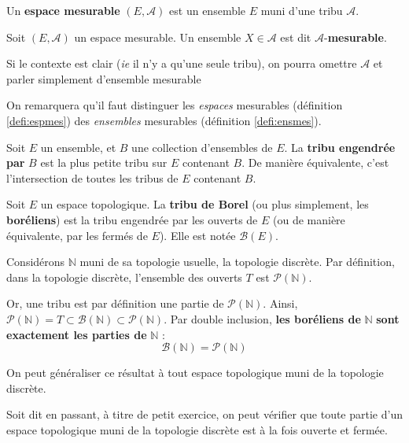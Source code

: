 \documentclass[../integ-proba.tex]{subfiles}
\begin{document}
  \begin{defi}
    \label{defi:espmes}
    Un \textbf{espace mesurable} $\left(E, \mathcal{A}\right)$ est un ensemble $E$ muni d'une tribu $\mathcal{A}$.
  \end{defi}

  \begin{defi}
    \label{defi:ensmes}
    Soit $\left(E, \mathcal{A}\right)$ un espace mesurable. Un ensemble $X\in \mathcal{A}$ est dit $\mathcal{A}$-\textbf{mesurable}.
  \end{defi}

  \begin{rem}
    Si le contexte est clair (\textit{ie} il n'y a qu'une seule tribu), on pourra omettre $\mathcal{A}$ et parler simplement d'ensemble mesurable
  \end{rem}

  \begin{rem}
    On remarquera qu'il faut distinguer les \textit{espaces} mesurables (définition \ref{defi:espmes}) des \textit{ensembles} mesurables (définition \ref{defi:ensmes}).
  \end{rem}

  \begin{defi}
    Soit $E$ un ensemble, et $B$ une collection d'ensembles de $E$.
    La \textbf{tribu engendrée par} $B$ est la plus petite tribu sur $E$ contenant $B$.
    De manière équivalente, c'est l'intersection de toutes les tribus de $E$ contenant $B$.
  \end{defi}

  \begin{defi}
    \label{defi:Borel}
    Soit $E$ un espace topologique.
    La \textbf{tribu de Borel} (ou plus simplement, les \textbf{boréliens}) est la tribu engendrée par les ouverts de $E$ (ou de manière équivalente, par les fermés de $E$).
    Elle est notée $\mathcal{B}(E)$.
  \end{defi}

  \begin{exemple}
    \label{exemple:boreliens_et_topologie_discrete}
    Considérons $\mathbb{N}$ muni de sa topologie usuelle, la topologie discrète.
    Par définition, dans la topologie discrète, l'ensemble des ouverts $T$ est $\mathcal{P}(\mathbb{N})$.

    Or, une tribu est par définition une partie de $\mathcal{P}(\mathbb{N})$.
    Ainsi, $\mathcal{P}(\mathbb{N}) = T \subset \mathcal{B}(\mathbb{N}) \subset \mathcal{P}(\mathbb{N})$.
    Par double inclusion, \textbf{les boréliens de} $\mathbb{N}$ \textbf{sont exactement les parties de} $\mathbb{N}$ :
    $$
    \mathcal{B}(\mathbb{N}) = \mathcal{P}(\mathbb{N})
    $$

    On peut généraliser ce résultat à tout espace topologique muni de la topologie discrète.

    Soit dit en passant, à titre de petit exercice, on peut vérifier que toute partie d'un espace topologique muni de la topologie discrète est à la fois ouverte et fermée.
  \end{exemple}
\end{document}
